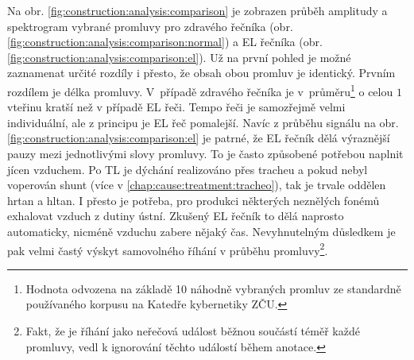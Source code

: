 Na obr. \ref{fig:construction:analysis:comparison} je zobrazen průběh amplitudy a spektrogram vybrané promluvy pro zdravého řečníka (obr. \ref{fig:construction:analysis:comparison:normal}) a EL řečníka (obr. \ref{fig:construction:analysis:comparison:el}).
Už na první pohled je možné zaznamenat určité rozdíly i přesto, že obsah obou promluv je identický.
Prvním rozdílem je délka promluvy.
V~případě zdravého řečníka je v~průměru\footnote{Hodnota odvozena na základě 10 náhodně vybraných promluv ze standardně používaného korpusu na Katedře kybernetiky ZČU.} o celou $1$ vteřinu kratší než v případě EL řeči.
Tempo řeči je samozřejmě velmi individuální, ale z principu je EL řeč pomalejší.
Navíc z průběhu signálu na obr. \ref{fig:construction:analysis:comparison:el} je patrné, že EL řečník dělá výraznější pauzy mezi jednotlivými slovy promluvy.
To je často způsobené potřebou naplnit jícen vzduchem.
Po TL je dýchání realizováno přes tracheu a pokud nebyl voperován shunt (více v \ref{chap:cause:treatment:tracheo}), tak je trvale oddělen hrtan a hltan.
I přesto je potřeba, pro produkci některých neznělých fonémů exhalovat vzduch z dutiny ústní.
Zkušený EL řečník to dělá naprosto automaticky, nicméně  vzduchu zabere nějaký čas.
Nevyhnutelným důsledkem je pak velmi častý výskyt samovolného říhání v průběhu promluvy\footnote{Fakt, že je říhání jako neřečová událost běžnou součástí téměř každé promluvy, vedl k ignorování těchto událostí během anotace.}.


